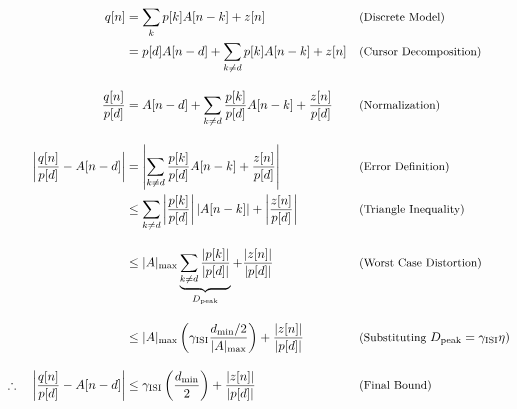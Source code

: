\newpage
\begin{align}
    q[n] &= \sum_{k} p[k] A[n-k] + z[n] && \text{\small (Discrete Model)} \nonumber \\
    &= p[d] A[n-d] + \sum_{k \neq d} p[k] A[n-k] + z[n] && \text{\small (Cursor Decomposition)} \nonumber \\[1em]
    \frac{q[n]}{p[d]} &= A[n-d] + \sum_{k \neq d} \frac{p[k]}{p[d]} A[n-k] + \frac{z[n]}{p[d]} && \text{\small (Normalization)} \nonumber \\[1em]
    \left| \frac{q[n]}{p[d]} - A[n-d] \right| &= \left| \sum_{k \neq d} \frac{p[k]}{p[d]} A[n-k] + \frac{z[n]}{p[d]} \right| && \text{\small (Error Definition)} \nonumber \\
    &\le \sum_{k \neq d} \left| \frac{p[k]}{p[d]} \right| |A[n-k]| + \left| \frac{z[n]}{p[d]} \right| && \text{\small (Triangle Inequality)} \nonumber \\[1em]
    &\le |A|_{\text{max}} \underbrace{\sum_{k \neq d} \frac{|p[k]|}{|p[d]|}}_{D_{\text{peak}}} + \frac{|z[n]|}{|p[d]|} && \text{\small (Worst Case Distortion)} \nonumber \\[1em]
    &\le |A|_{\text{max}} \left( \gamma_{\text{ISI}} \frac{d_{\text{min}}/2}{|A|_{\text{max}}} \right) + \frac{|z[n]|}{|p[d]|} && \text{\small (Substituting } D_{\text{peak}} = \gamma_{\text{ISI}}\eta \text{)} \nonumber \\[1em]
    \therefore \quad \left| \frac{q[n]}{p[d]} - A[n-d] \right| &\le \gamma_{\text{ISI}} \left( \frac{d_{\text{min}}}{2} \right) + \frac{|z[n]|}{|p[d]|} && \text{\small (Final Bound)}
\end{align}